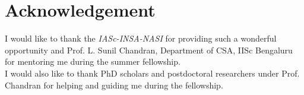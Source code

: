 \documentclass[11pt]{article}
\begin{document}
\section*{Acknowledgement}
I would like to thank the \textit{IASc-INSA-NASI} for providing such a wonderful opportunity and {Prof. L. Sunil Chandran}, Department of CSA, IISc Bengaluru for mentoring me during the summer fellowship.\\
I would also like to thank PhD scholars and postdoctoral researchers under Prof. Chandran for helping and guiding me during the fellowship.\\
\end{document}
